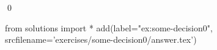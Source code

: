 
\begin{ex} 
  \label{ex:some-decision0}
  
  \qed
\end{ex} 
\begin{python0}
from solutions import *
add(label="ex:some-decision0",
    srcfilename='exercises/some-decision0/answer.tex') 
\end{python0}
